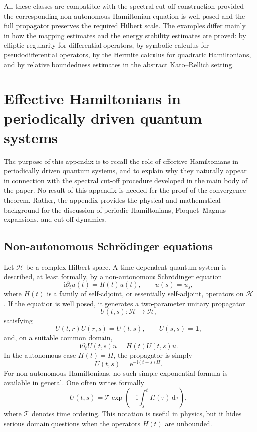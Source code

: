 \documentclass[11pt]{amsart}
\theoremstyle{plain}
\theoremstyle{definition}
\theoremstyle{remark}
\newcommand{\Hilb}{\mathcal H}
\newcommand{\Id}{\mathbf 1}
\newcommand{\ii}{\mathrm i}
\newcommand{\ee}{\mathrm e}
\newcommand{\dd}{\,\mathrm d}
\begin{document}
All these classes are compatible with the spectral cut-off construction
provided the corresponding non-autonomous Hamiltonian equation is
well posed and the full propagator preserves the required Hilbert
scale.  The examples differ mainly in how the mapping estimates and the
energy stability estimates are proved: by elliptic regularity for
differential operators, by symbolic calculus for pseudodifferential
operators, by the Hermite calculus for quadratic Hamiltonians, and by
relative boundedness estimates in the abstract Kato--Rellich setting.
\appendix

\section{Effective Hamiltonians in periodically driven quantum systems}
\label{app:effective-hamiltonians}

The purpose of this appendix is to recall the role of effective
Hamiltonians in periodically driven quantum systems, and to explain why
they naturally appear in connection with the spectral cut-off procedure
developed in the main body of the paper.  No result of this appendix is
needed for the proof of the convergence theorem.  Rather, the appendix
provides the physical and mathematical background for the discussion of
periodic Hamiltonians, Floquet--Magnus expansions, and cut-off dynamics.

\subsection{Non-autonomous Schr\"odinger equations}

Let \(\Hilb\) be a complex Hilbert space.  A time-dependent quantum system
is described, at least formally, by a non-autonomous Schr\"odinger
equation
\[
        \ii \partial_t u(t)=H(t)u(t),
        \qquad u(s)=u_s,
\]
where \(H(t)\) is a family of self-adjoint, or essentially self-adjoint,
operators on \(\Hilb\).  If the equation is well posed, it generates a
two-parameter unitary propagator
\[
        U(t,s):\Hilb\to\Hilb,
\]
satisfying
\[
        U(t,r)U(r,s)=U(t,s),
        \qquad
        U(s,s)=\Id,
\]
and, on a suitable common domain,
\[
        \ii \partial_t U(t,s)u=H(t)U(t,s)u.
\]
In the autonomous case \(H(t)=H\), the propagator is simply
\[
        U(t,s)=\ee^{-\ii(t-s)H}.
\]
For non-autonomous Hamiltonians, no such simple exponential formula is
available in general.  One often writes formally
\[
        U(t,s)
        =
        \mathcal T
        \exp\left(
        -\ii\int_s^t H(\tau)\dd \tau
        \right),
\]
where \(\mathcal T\) denotes time ordering.  This notation is useful in
physics, but it hides serious domain questions when the operators
\(H(t)\) are unbounded.
\end{document}
